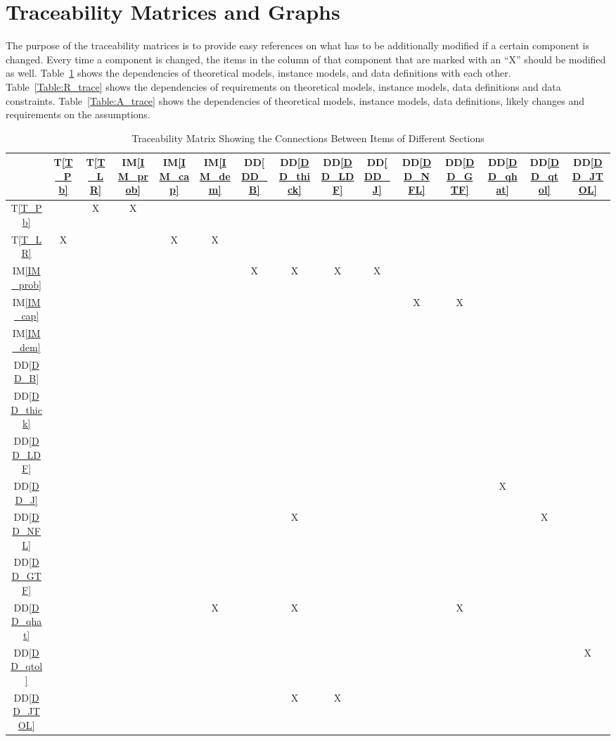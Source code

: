 \documentclass[12pt]{article}
\newcommand{\ddref}[1]{DD\ref{#1}}
\newcommand{\tref}[1]{T\ref{#1}}
\newcommand{\iref}[1]{IM\ref{#1}}
\begin{document}
\section{Traceability Matrices and Graphs}
The purpose of the traceability matrices is to provide easy references on what 
has to be additionally modified if a certain component is changed.  Every time a 
component is changed, the items in the column of that component that are 
marked with an ``X'' should be modified as well.  Table~\ref{Table:trace}
shows the dependencies of theoretical models, instance models, and data 
definitions with each other. Table~\ref{Table:R_trace} shows the dependencies of 
requirements on theoretical models, instance models, data definitions and 
data constraints. Table~\ref{Table:A_trace} shows the dependencies 
of theoretical models, instance models, data definitions, likely changes and 
requirements on the assumptions.
\newline

\begin{table}[h!]
\centering
\begin{tabular}{|c|c|c|c|c|c|c|c|c|c|c|c|c|c|c|}
\hline        
	& \tref{T_Pb} & \tref{T_LR} & \iref{IM_prob} & \iref{IM_cap}& \iref{IM_dem} & 
	\ddref{DD_B} & \ddref{DD_thick} & \ddref{DD_LDF} & \ddref{DD_J} & \ddref{DD_NFL} & 
	\ddref{DD_GTF} & \ddref{DD_qhat} & \ddref{DD_qtol} & \ddref{DD_JTOL} \\
\hline
\tref{T_Pb}           & & X & X & & & & & & & & & & & \\ \hline
\tref{T_LR}             & X & & & X & X & & & & & & & & & \\ \hline
\iref{IM_prob}      & & & & & & X & X & X & X & & & & & \\ \hline
\iref{IM_cap}        & & & & & & & & & & X & X & & & \\ \hline
\iref{IM_dem}       & & & & & & & & & & & & & & \\ \hline
\ddref{DD_B}       & & & & & & & & & & & & & & \\ \hline
\ddref{DD_thick}  & & & & & & & & & & & & & & \\ \hline
\ddref{DD_LDF}   & & & & & & & & & & & & & & \\ \hline
\ddref{DD_J}        & & & & & & & & & & & & X & & \\ \hline
\ddref{DD_NFL}   & & & & & & & X & & & & & & X & \\ \hline
\ddref{DD_GTF}   & & & & & & & & & & & & & & \\ \hline
\ddref{DD_qhat}   & & & & & X & & X & & & & X & & & \\ \hline
\ddref{DD_qtol}    & & & & & & & & & & & & & & X \\ \hline
\ddref{DD_JTOL} & & & & & & & X & X & & & & & & \\
\hline
\end{tabular}
\caption{Traceability Matrix Showing the Connections Between Items of Different Sections}
\label{Table:trace}
\end{table}
\end{document}
